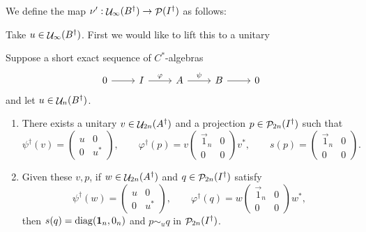 We define the map $\nu': \mathop{\mathcal{U}}\nolimits_\infty(B^\dagger)\to \mathop{\mathcal{P}}\nolimits(I^\dagger)$ as follows:

Take $u\in \mathop{\mathcal{U}}\nolimits_\infty(B^\dagger)$. First we would like to lift this to a unitary 

\begin{lemma}
Suppose a short exact sequence of $C^*$-algebras
\[  \begin{tikzcd}
0 \rar & I \rar{\varphi} & A \rar{\psi} & B\rar & 0
\end{tikzcd}\]
and let $u\in \mathop{\mathcal{U}}\nolimits_n(B^\dagger)$.
\begin{enumerate}
\item There exists a unitary $v\in\mathop{\mathcal{U}}\nolimits_{2n}(A^\dagger)$ and a projection $p\in\mathop{\mathcal{P}}\nolimits_{2n}(I^\dagger)$ such that
\[ \psi^\dagger(v) = \begin{pmatrix}
u & 0 \\ 0 & u^*
\end{pmatrix}, \qquad \varphi^\dagger(p) = v \begin{pmatrix}
\vec{1}_n & 0 \\ 0 & 0
\end{pmatrix}v^*, \qquad s(p) = \begin{pmatrix}
\vec{1}_n & 0 \\ 0 & 0
\end{pmatrix}. \]
\item Given these $v,p$, if $w\in\mathop{\mathcal{U}}\nolimits_{2n}(A^\dagger)$ and $q\in\mathop{\mathcal{P}}\nolimits_{2n}(I^\dagger)$ satisfy
\[ \psi^\dagger(w) = \begin{pmatrix}
u & 0 \\ 0 & u^*
\end{pmatrix}, \qquad \varphi^\dagger(q) = w \begin{pmatrix}
\vec{1}_n & 0 \\ 0 & 0
\end{pmatrix}w^*, \]
then $s(q) = \operatorname{diag}(\boldsymbol{\mathrm{1}}_n, 0_n)$ and $p\sim_u q$ in $\mathop{\mathcal{P}}\nolimits_{2n}(I^\dagger)$.
\end{enumerate}
\end{lemma}
